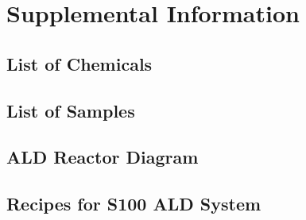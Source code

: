 \chapter{Supplemental Information}
\label{chap:appendix}
\thispagestyle{empty}


\section{List of Chemicals}
\label{sup:LoChemicals}











\section{List of Samples}
\label{sup:LoSamples}



\section{ALD Reactor Diagram}
\label{sup:ALD-design}



\section{Recipes for S100 ALD System}
\label{sup:ALD-recipes}



